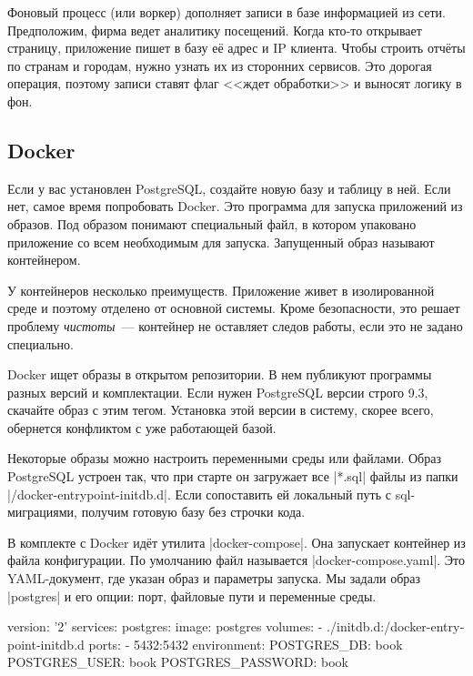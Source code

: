 Фоновый процесс (или воркер) дополняет записи в базе информацией из
сети. Предположим, фирма ведет аналитику посещений. Когда кто-то открывает
страницу, приложение пишет в базу е\"{е} адрес и IP клиента. Чтобы строить
отч\"{е}ты по странам и городам, нужно узнать их из сторонних сервисов. Это дорогая
операция, поэтому записи ставят флаг <<ждет обработки>> и выносят логику в фон.

\subsection{Docker}

\label{docker-db}

Если у вас установлен PostgreSQL, создайте новую базу и таблицу в ней. Если нет,
самое время попробовать Docker. Это программа для запуска приложений из
образов. Под образом понимают специальный файл, в котором упаковано приложение
со всем необходимым для запуска. Запущенный образ называют контейнером.

У контейнеров несколько преимуществ. Приложение живет в изолированной среде и
поэтому отделено от основной системы. Кроме безопасности, это решает проблему
\emph{чистоты}~--- контейнер не оставляет следов работы, если это не задано
специально.

Docker ищет образы в открытом репозитории. В нем публикуют программы разных
версий и комплектации. Если нужен PostgreSQL версии строго 9.3, скачайте образ с
этим тегом. Установка этой версии в систему, скорее всего, обернется конфликтом
с уже работающей базой.

Некоторые образы можно настроить переменными среды или файлами. Образ PostgreSQL
устроен так, что при старте он загружает все \spverb|*.sql| файлы из папки
\spverb|/docker-entrypoint-initdb.d|. Если сопоставить ей локальный путь с
sql-миграциями, получим готовую базу без строчки кода.

В комплекте с Docker ид\"{е}т утилита \spverb|docker-compose|. Она запускает
контейнер из файла конфигурации. По умолчанию файл называется
\spverb|docker-compose.yaml|. Это YAML-документ, где указан образ и параметры
запуска. Мы задали образ \spverb|postgres| и его опции: порт, файловые пути и
переменные среды.

\begin{english}
  \begin{yaml}
version: '2'
services:
  postgres:
    image: postgres
    volumes:
      - ./initdb.d:/docker-entrypoint-initdb.d
    ports:
      - 5432:5432
    environment:
      POSTGRES_DB: book
      POSTGRES_USER: book
      POSTGRES_PASSWORD: book
  \end{yaml}
\end{english}

